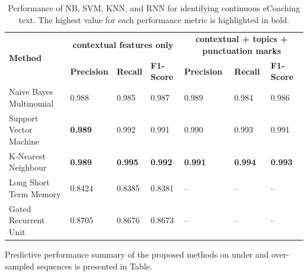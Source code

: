 \documentclass{amia}
\begin{document}
\begin{table}[ht]
\centering
\caption{Performance of NB, SVM, KNN, and RNN for identifying continuous eCoaching text. The highest value for each performance metric is highlighted in bold.}
\label{tab:result_under_over_sampled}
  \begin{tabular}{|l|l|l|l|l|l|l|}
  \hline
   \multirow{2}{*}{\textbf{Method}} & \multicolumn{3}{|c|}{\textbf{contextual features only}} & \multicolumn{3}{|c|}{\textbf{contextual + topics + punctuation marks}} \\\cline{2-7}
   & \textbf{Precision}  & \textbf{Recall} & \textbf{F1-Score} & \textbf{Precision}  & \textbf{Recall} & \textbf{F1-Score}\\ \hline    
    
 Naive Bayes Multinomial & 0.988 & 0.985 & 0.987 & 0.989 & 0.984 & 0.986 \\ \hline
 Support Vector Machine & \textbf{0.989} & 0.992 & 0.991 & 0.990 & 0.993 & 0.991\\ \hline
 K-Nearest Neighbour & \textbf{0.989} & \textbf{0.995} & \textbf{0.992} & \textbf{0.991} & \textbf{0.994} & \textbf{0.993}\\ \hline
 Long Short Term Memory & 0.8424 & 0.8385 & 0.8381 & -- & -- & --\\ \hline
 Gated Recurrent Unit & 0.8705 & 0.8676 & 0.8673 & -- & -- & --\\ \hline 
  \end{tabular}
\end{table}


Predictive performance summary of the proposed methods on under and over-sampled sequences is presented in Table.\\
\end{document}
